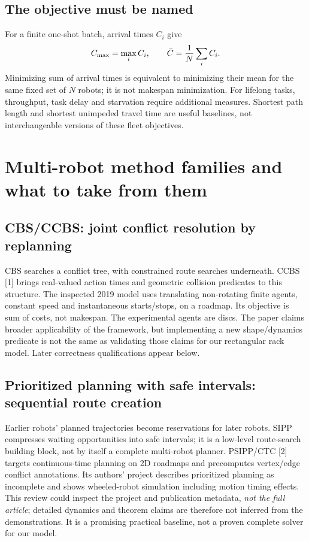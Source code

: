 \documentclass[11pt,a4paper]{article}
\begin{document}
\subsection*{The objective must be named}
For a finite one-shot batch, arrival times $C_i$ give
\begin{equation}
C_{\max}=\max_i C_i,\qquad \bar C={1\over N}\sum_i C_i.
\end{equation}
Minimizing sum of arrival times is equivalent to minimizing their mean for the
same fixed set of $N$ robots; it is not makespan minimization. For lifelong
tasks, throughput, task delay and starvation require additional measures.
Shortest path length and shortest unimpeded travel time are useful baselines,
not interchangeable versions of these fleet objectives.

\clearpage
\section{Multi-robot method families and what to take from them}
\subsection*{CBS/CCBS: joint conflict resolution by replanning}
CBS searches a conflict tree, with constrained route searches underneath.
CCBS [1] brings real-valued action times and geometric collision predicates
to this structure. The inspected 2019 model uses translating non-rotating
finite agents, constant speed and instantaneous starts/stops, on a roadmap.
Its objective is sum of costs, not makespan. The experimental agents are discs.
The paper claims broader applicability of the framework, but implementing a
new shape/dynamics predicate is not the same as validating those claims for
our rectangular rack model. Later correctness qualifications appear below.

\subsection*{Prioritized planning with safe intervals: sequential route creation}
Earlier robots' planned trajectories become reservations for later robots.
SIPP compresses waiting opportunities into safe intervals; it is a low-level
route-search building block, not by itself a complete multi-robot planner.
PSIPP/CTC [2] targets continuous-time planning on 2D roadmaps and precomputes
vertex/edge conflict annotations. Its authors' project describes prioritized
planning as incomplete and shows wheeled-robot simulation including motion
timing effects. This review could inspect the project and publication metadata,
\emph{not the full article}; detailed dynamics and theorem claims are therefore
not inferred from the demonstrations. It is a promising practical baseline,
not a proven complete solver for our model.
\end{document}
